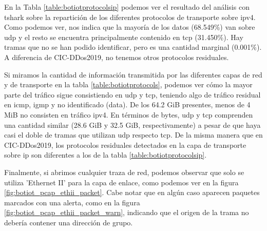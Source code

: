 En la Tabla \ref{table:botiotprotocolsip} podemos ver el resultado del análisis con tshark sobre la repartición de los diferentes protocolos de transporte sobre \acrshort{ipv4}. Como podemos ver, nos indica que la mayoría de los datos (68.549\%) van sobre \acrshort{udp} y el resto se encuentra principalmente contenido en \acrshort{tcp} (31.450\%). Hay tramas que no se han podido identificar, pero es una cantidad marginal (0.001\%). A diferencia de CIC-DDos2019, no tenemos otros protocolos residuales.



Si miramos la cantidad de información transmitida por las diferentes capas de red y de transporte en la tabla \ref{table:botiotprotocols}, podemos ver cómo la mayor parte del tráfico sigue consistiendo en \acrshort{udp} y \acrshort{tcp}, teniendo algo de tráfico residual en \acrshort{icmp}, \acrshort{igmp} y no identificado (data). De los 64.2 GiB presentes, menos de 4 MiB no consisten en tráfico \acrshort{ipv4}. En términos de bytes, \acrshort{udp} y \acrshort{tcp} comprenden una cantidad similar (28.6 GiB y 32.5 GiB, respectivamente) a pesar de que haya casi el doble de tramas que utilizan \acrshort{udp} respecto \acrshort{tcp}. De la misma manera que en CIC-DDos2019, los protocolos residuales detectados en la capa de transporte sobre \acrshort{ip} son diferentes a los de la tabla \ref{table:botiotprotocolsip}.



Finalmente, si abrimos cualquier traza de red, podemos observar que solo se utiliza 'Ethernet II' para la capa de enlace, como podemos ver en la figura \ref{fig:botiot_pcap_ethii_packet}. Cabe notar que en algún caso aparecen paquetes marcados con una alerta, como en la figura \ref{fig:botiot_pcap_ethii_packet_warn}, indicando que el origen de la trama no debería contener una dirección de grupo.

